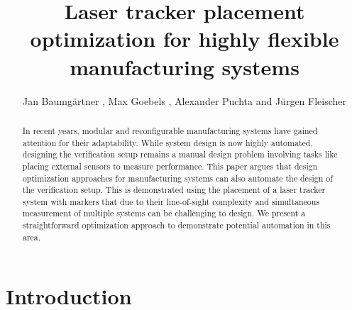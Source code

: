\documentclass{svproc}
\begin{document}
\mainmatter              %
\title{
Laser tracker placement optimization for highly flexible manufacturing systems
}


\newcommand*\samethanks[1][\value{footnote}]{\footnotemark[#1]}
\makeatletter
\renewcommand*{\@fnsymbol}[1]{\ifcase#1\or\@arabic{#1}\else*\fi}
\makeatother

\author{Jan Baumgärtner ,
Max Goebels ,   Alexander Puchta  and Jürgen Fleischer%
}


\maketitle

\begin{abstract}
In recent years, modular and reconfigurable manufacturing systems have gained attention for their adaptability.
While system design is now highly automated, designing the verification setup remains a manual design problem involving tasks like placing external sensors to measure performance.
This paper argues that design optimization approaches for manufacturing systems can also automate the design of the verification setup.
This is demonstrated using the placement of a laser tracker system with markers that due to their line-of-sight complexity and simultaneous measurement of multiple systems can be challenging to design.
We present a straightforward optimization approach to demonstrate potential automation in this area.
\end{abstract}
\section{Introduction}
\end{document}
